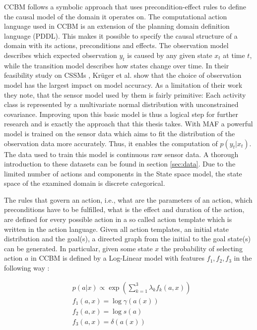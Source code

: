\documentclass[11pt,titlepage,oneside,openany]{book}
\begin{document}
CCBM follows a symbolic approach that uses precondition-effect rules to define the causal model of the domain it operates on. The computational action language used in CCBM is an extension of the planning domain definition language (PDDL). This makes it possible to specify the causal structure of a domain with its actions, preconditions and effects. The observation model describes which expected observation $y_t$ is caused by any given state $x_t$ at time $t$, while the transition model describes how states change over time. In their feasibility study on CSSMs \cite{kruger_computational_2014}, Kr\"uger et al. show that the choice of observation model has the largest impact on model accuracy. As a limitation of their work they note, that the sensor model used by them is fairly primitive: Each activity class is represented by a multivariate normal distribution with unconstrained covariance. Improving upon this basic model is thus a logical step for further research and is exactly the approach that this thesis takes. With MAF a powerful model is trained on the sensor data which aims to fit the distribution of the observation data more accurately. Thus, it enables the computation of $p(y_t|x_t)$. The data used to train this model is continuous raw sensor data. A thorough introduction to these datasets can be found in section \ref{sec:data}. Due to the limited number of actions and components in the State space model, the state space of the examined domain is discrete categorical.

The rules that govern an action, i.e., what are the parameters of an action, which preconditions have to be fulfilled, what is the effect and duration of the action, are defined for every possible action in a so called action template which is written in the action language. Given all action templates, an initial state distribution and the goal(s), a directed graph from the initial to the goal state(s) can be generated. In particular, given some state $x$ the probability of selecting action $a$ in CCBM is defined by a Log-Linear model with features $f_1, f_2, f_3$ in the following way \cite{rueda_combining_2019}:

\begin{align}
	&p(a|x) \propto 	\exp(\sum_{k=1}^{3} \lambda_k f_k(a,x)) \label{func:ccbm} \\
	&f_1(a,x) = 		\log \gamma(a(x)) \\
	&f_2(a,x) = 		\log s(a) \\
	&f_3(a,x) = 		\delta(a(x))
\end{align}
\end{document}
